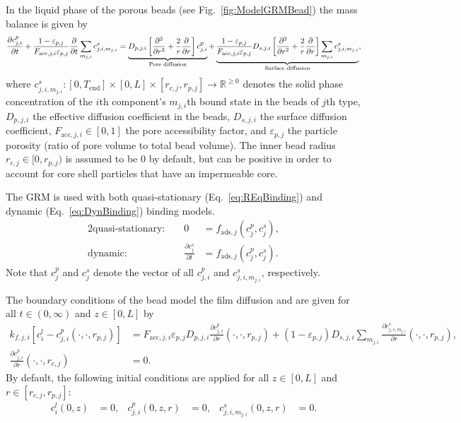 In the liquid phase of the porous beads (see Fig.~\ref{fig:ModelGRMBead}) the mass balance is given by
\begin{align}
	\frac{\pdiff c^p_{j,i}}{\pdiff t} + \frac{1 - \varepsilon_{p,j}}{F_{\text{acc},j,i} \varepsilon_{p,j}} \frac{\pdiff}{\pdiff t} \sum_{m_{j,i}} c^s_{j,i,m_{j,i}} = \underbrace{D_{p,j,i} \left[\frac{\pdiff^2}{\pdiff r^2} + \frac{2}{r} \frac{\pdiff}{\pdiff r} \right]c^p_{j,i}}_{\text{Pore diffusion}} + \underbrace{\frac{1 - \varepsilon_{p,j}}{F_{\text{acc},j,i} \varepsilon_{p,j}} D_{s,j,i} \left[\frac{\pdiff^2}{\pdiff r^2} + \frac{2}{r} \frac{\pdiff }{\pdiff r} \right] \sum_{m_{j,i}} c^s_{j,i,m_{j,i}} }_{\text{Surface diffusion}}, \label{eq:ModelBead}
\end{align}
where $c^s_{j,i,m_{j,i}}\colon \left[0, T_{\text{end}}\right] \times [0,L] \times [r_{c,j}, r_{p,j}] \rightarrow \mathds{R}^{\geq 0}$ denotes the solid phase concentration of the $i$th component's $m_{j,i}$th bound state in the beads of $j$th type, $D_{p,j,i}$ the effective diffusion coefficient in the beads, $D_{s,j,i}$ the surface diffusion coefficient, $F_{\text{acc},j,i} \in [0,1]$ the pore accessibility factor, and $\varepsilon_{p,j}$ the particle porosity (ratio of pore volume to total bead volume).
The inner bead radius $r_{c,j} \in [0, r_{p,j})$ is assumed to be $0$ by default, but can be positive in order to account for core shell particles that have an impermeable core.

The GRM is used with both quasi-stationary (Eq.~\eqref{eq:REqBinding}) and dynamic (Eq.~\eqref{eq:DynBinding}) binding models. 
\begin{alignat}{2}
	\text{quasi-stationary: }& & 0 &= f_{\text{ads},j}\left( c^p_j, c^s_j\right), \label{eq:REqBinding} \\
	\text{dynamic: }& & \frac{\partial c^s_j}{\partial t} &= f_{\text{ads},j}\left( c^p_j, c^s_j\right). \label{eq:DynBinding}
\end{alignat}
Note that $c^p_j$ and $c^s_j$ denote the vector of all $c^p_{j,i}$ and $c^s_{j,i,m_{j,i}}$, respectively.

The boundary conditions of the bead model the film diffusion and are given for all ${t \in (0,\infty)}$ and $z \in [0,L]$ by
\begin{align}
	k_{f,j,i}\left[ c^l_i - c^p_{j,i}(\cdot, \cdot, r_{p,j}) \right] &= F_{\text{acc},j,i} \varepsilon_{p,j} D_{p,j,i} \frac{\partial c^p_{j,i}}{\partial r}(\cdot, \cdot, r_{p,j}) + \left( 1 - \varepsilon_{p,j}\right) D_{s,j,i} \sum_{m_{j,i}} \frac{\partial c^s_{j,i,m_{j,i}}}{\partial r}(\cdot, \cdot, r_{p,j}), \label{eq:BCBeadIn} \\
	\frac{\partial c^p_{j,i}}{\partial r}(\cdot, \cdot, r_{c,j}) &= 0. \label{eq:BCBeadCenter}
\end{align}
By default, the following initial conditions are applied for all $z \in [0,L]$ and $r \in \left[r_{c,j}, r_{p,j}\right]$:
\begin{align}
	c^l_i(0, z) &= 0, & c^p_{j,i}(0, z, r) &= 0, & c^s_{j,i,m_{j,i}}(0,z,r) &= 0. \label{eq:InitialConditions}
\end{align}

